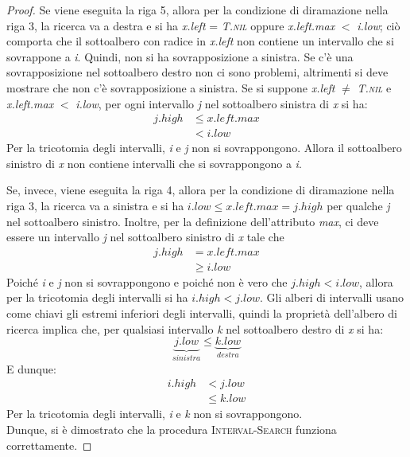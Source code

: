 \documentclass[10pt, a4paper]{report}
\begin{document}
\begin{proof}
Se viene eseguita la riga 5, allora per la condizione di diramazione nella riga 3, la ricerca va a destra e si ha \textit{x.left} = \textit{T.\textsc{nil}} oppure \textit{x.left.max} $<$ \textit{i.low}; ciò comporta che il sottoalbero con radice in \textit{x.left} non contiene un intervallo che si sovrappone a \textit{i}. Quindi, non si ha sovrapposizione a sinistra. Se c'è una sovrapposizione nel sottoalbero destro non ci sono problemi, altrimenti si deve mostrare che non c'è sovrapposizione a sinistra. Se si suppone \textit{x.left} $\neq$ \textit{T.\textsc{nil}} e \textit{x.left.max} $<$ \textit{i.low}, per ogni intervallo \textit{j} nel sottoalbero sinistra di \textit{x} si ha:
\begin{align*}
j.high &\leq x.left.max \\
&< i.low
\end{align*}
Per la tricotomia degli intervalli, \textit{i} e \textit{j} non si sovrappongono. Allora il sottoalbero sinistro di \textit{x} non contiene intervalli che si sovrappongono a \textit{i}.

Se, invece, viene eseguita la riga 4, allora per la condizione di diramazione nella riga 3, la ricerca va a sinistra e si ha $i.low \leq x.left.max = j.high$ per qualche \textit{j} nel sottoalbero sinistro. Inoltre, per la definizione dell'attributo \textit{max}, ci deve essere un intervallo \textit{j} nel sottoalbero sinistro di \textit{x} tale che
\begin{align*}
j.high &= x.left.max \\
&\geq i.low
\end{align*}
Poiché \textit{i} e \textit{j} non si sovrappongono e poiché non è vero che $j.high < i.low$, allora per la tricotomia degli intervalli si ha $i.high < j.low$. Gli alberi di intervalli usano come chiavi gli estremi inferiori degli intervalli, quindi la proprietà dell'albero di ricerca implica che, per qualsiasi intervallo \textit{k} nel sottoalbero destro di \textit{x} si ha:
\begin{equation*}
\underbrace{j.low}_{sinistra} \leq \underbrace{k.low}_{destra}
\end{equation*}
E dunque:
\begin{align*}
i.high &< j.low \\
&\leq k.low
\end{align*}
Per la tricotomia degli intervalli, \textit{i} e \textit{k} non si sovrappongono.\\Dunque, si è dimostrato che la procedura \textsc{Interval-Search} funziona correttamente.  
\end{proof}
\end{document}
